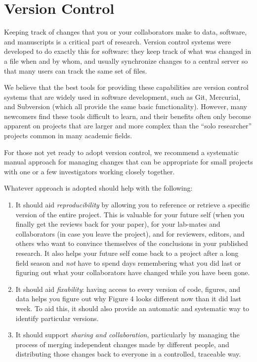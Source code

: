 \documentclass[10pt]{article}
\begin{document}
\section{Version Control}\label{version-control}

Keeping track of changes that you or your collaborators make to data,
software, and manuscripts is a critical part of research. Version
control systems were developed to do exactly this for software: they
keep track of what was changed in a file when and by whom, and usually
synchronize changes to a central server so that many users can track the
same set of files.

We believe that the best tools for providing these capabilities are
version control systems that are widely used in software development,
such as Git, Mercurial, and Subversion (which all provide the same basic
functionality). However, many newcomers find these tools difficult to
learn, and their benefits often only become apparent on projects that
are larger and more complex than the ``solo researcher'' projects common
in many academic fields.

For those not yet ready to adopt version control, we recommend a
systematic manual approach for managing changes that can be appropriate
for small projects with one or a few investigators working closely
together.

Whatever approach is adopted should help with the following:

\begin{enumerate}
\item
  It should aid \emph{reproducibility} by allowing you to reference or
  retrieve a specific version of the entire project. This is valuable
  for your future self (when you finally get the reviews back for your
  paper), for your lab-mates and collaborators (in case you leave the
  project), and for reviewers, editors, and others who want to convince
  themselves of the conclusions in your published research. It also
  helps your future self come back to a project after a long field
  season and \emph{not} have to spend days remembering what you did last
  or figuring out what your collaborators have changed while you have
  been gone.
\item
  It should aid \emph{fixability}: having access to every version of
  code, figures, and data helps you figure out why Figure 4 looks
  different now than it did last week.  To aid this, it should also
  provide an automatic and systematic way to identify particular
  versions.
\item
  It should support \emph{sharing and collaboration}, particularly by
  managing the process of merging independent changes made by different
  people, and distributing those changes back to everyone in a
  controlled, traceable way.
\end{enumerate}
\end{document}
